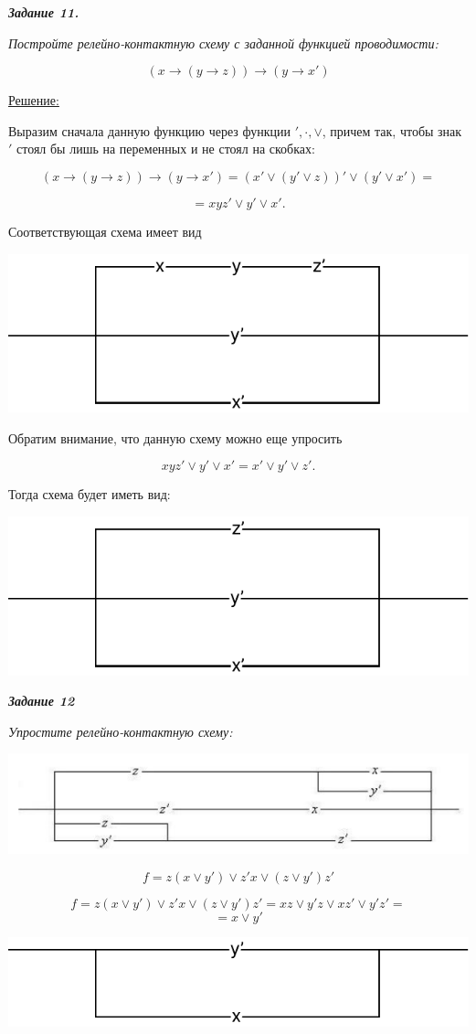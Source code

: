 \documentclass[12pt]{article}
\begin{document}
\textit{\textbf{Задание 11.}}

\textit{Постройте релейно-контактную схему с заданной функцией
проводимости:}

$$(x \rightarrow (y \rightarrow z)) \rightarrow (y \rightarrow x')$$

\underline{Решение:}

Выразим сначала данную функцию через функции $', \cdot , \lor$, причем так,
чтобы знак $'$ стоял бы лишь на переменных и не стоял на скобках:

$$(x \rightarrow (y \rightarrow z)) \rightarrow (y \rightarrow x') = (x' \lor (y' \lor z))' \lor (y' \lor x') = $$

$$ = xyz' \lor y' \lor x'.$$

Соответствующая схема имеет вид

\includegraphics{11_1.pdf}

Обратим внимание, что данную схему можно еще упросить

$$ xyz' \lor y' \lor x' = x' \lor y' \lor z'.$$

Тогда схема будет иметь вид:

\includegraphics{11_2.pdf}

\pagebreak

\textit{\textbf{Задание 12}}

\textit{Упростите релейно-контактную схему:}

\includegraphics[scale=0.5]{12_1}

$$f=z(x \lor y') \lor z'x \lor (z \lor y')z'$$

$$f=z(x \lor y') \lor z'x \lor (z \lor y')z' = xz \lor y'z \lor xz' \lor y'z' =$$
$$ = x \lor y' $$

\includegraphics{12_2}
\end{document}
